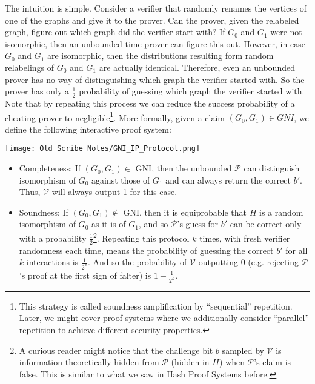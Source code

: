 The intuition is simple. Consider a verifier that randomly renames the vertices of one of the graphs and give it to the prover. Can the prover, given the relabeled graph, figure out which graph did the verifier start with?  If $G_0$ and $G_1$ were not isomorphic, then an unbounded-time prover can figure this out. However, in case $G_0$ and $G_1$ {are} isomorphic, then the distributions resulting form random relabelings of $G_0$ and $G_1$ are actually identical. Therefore, even an unbounded prover has no way of distinguishing which graph the verifier started with. So the prover has only a $\frac12$ probability of guessing which graph the verifier started with. Note that by repeating this process we can reduce the success probability of a cheating prover to negligible\footnote{This strategy is called soundness amplification by ``sequential'' repetition. Later, we might cover proof systems where we additionally consider ``parallel'' repetition to achieve different security properties.}. More formally, given a claim $(G_0,G_1)\in GNI$, we define the following interactive proof system:


		\begin{center}
			\texttt{[image: Old Scribe Notes/GNI\_IP\_Protocol.png]}
		\end{center}

		\begin{itemize}
			\item Completeness: If $(G_0,G_1)\in$ GNI, then the unbounded $\mathcal{P}$ can distinguish isomorphism of $G_0$ against those of $G_1$ and can always return the correct $b'$.  Thus, $\mathcal{V}$ will always output 1 for this case.
			\item Soundness: If $(G_0,G_1)\notin$ GNI, then it is equiprobable that $H$ is a random isomorphism of $G_0$ as it is of $G_1$, and so $\mathcal{P}$'s guess for $b'$ can be correct only with a probability $\frac{1}{2}$\footnote{A curious reader might notice that the challenge bit $b$ sampled by $\mathcal{V}$ is information-theoretically hidden from $\mathcal{P}$ (hidden in $H$) when $\mathcal{P}$'s claim is false. This is similar to what we saw in Hash Proof Systems before.}.  Repeating this protocol $k$ times, with fresh verifier randomness each time, means the probability of guessing the correct $b'$ for all $k$ interactions is $\frac{1}{2^k}$.  And so the probability of $\mathcal{V}$ outputting $0$ (e.g. rejecting $\mathcal{P}$'s proof at the first sign of falter) is $1-\frac{1}{2^k}$.  

		\end{itemize}

